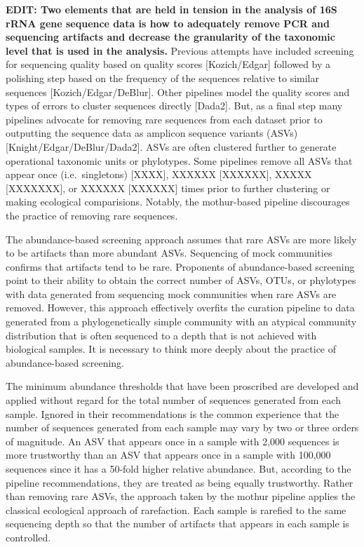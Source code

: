 \documentclass[
]{article}
\begin{document}
\textbf{EDIT: Two elements that are held in tension in the analysis of
16S rRNA gene sequence data is how to adequately remove PCR and
sequencing artifacts and decrease the granularity of the taxonomic level
that is used in the analysis.} Previous attempts have included screening
for sequencing quality based on quality scores {[}Kozich/Edgar{]}
followed by a polishing step based on the frequency of the sequences
relative to similar sequences {[}Kozich/Edgar/DeBlur{]}. Other pipelines
model the quality scores and types of errors to cluster sequences
directly {[}Dada2{]}. But, as a final step many pipelines advocate for
removing rare sequences from each dataset prior to outputting the
sequence data as amplicon sequence variants (ASVs)
{[}Knight/Edgar/DeBlur/Dada2{]}. ASVs are often clustered further to
generate operational taxonomic units or phylotypes. Some pipelines
remove all ASVs that appear once (i.e.~singletons) {[}XXXX{]}, XXXXXX
{[}XXXXXX{]}, XXXXX {[}XXXXXXX{]}, or XXXXXX {[}XXXXXX{]} times prior to
further clustering or making ecological comparisions. Notably, the
mothur-based pipeline discourages the practice of removing rare
sequences.

The abundance-based screening approach assumes that rare ASVs are more
likely to be artifacts than more abundant ASVs. Sequencing of mock
communities confirms that artifacts tend to be rare. Proponents of
abundance-based screening point to their ability to obtain the correct
number of ASVs, OTUs, or phylotypes with data generated from sequencing
mock communities when rare ASVs are removed. However, this approach
effectively overfits the curation pipeline to data generated from a
phylogenetically simple community with an atypical community
distribution that is often sequenced to a depth that is not achieved
with biological samples. It is necessary to think more deeply about the
practice of abundance-based screening.

The minimum abundance thresholds that have been proscribed are developed
and applied without regard for the total number of sequences generated
from each sample. Ignored in their recommendations is the common
experience that the number of sequences generated from each sample may
vary by two or three orders of magnitude. An ASV that appears once in a
sample with 2,000 sequences is more trustworthy than an ASV that appears
once in a sample with 100,000 sequences since it has a 50-fold higher
relative abundance. But, according to the pipeline recommendations, they
are treated as being equally trustworthy. Rather than removing rare
ASVs, the approach taken by the mothur pipeline applies the classical
ecological approach of rarefaction. Each sample is rarefied to the same
sequencing depth so that the number of artifacts that appears in each
sample is controlled.
\end{document}
